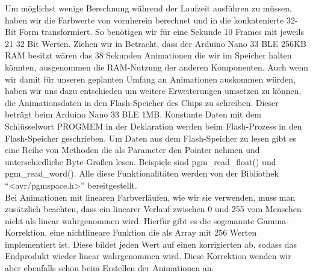         Um möglichst wenige Berechnung während der Laufzeit ausführen zu müssen, haben wir die Farbwerte von vornherein berechnet und in die konkatenierte 32-Bit Form transformiert. 
        So benötigen wir für eine Sekunde 10 Frames mit jeweils 21 32 Bit Werten.
        Ziehen wir in Betracht, dass der Arduino Nano 33 BLE 256KB RAM besitzt wären das 38 Sekunden Animationen die wir im Speicher halten könnten, ausgenommen die RAM-Nutzung der anderen Komponenten.
        Auch wenn wir damit für unseren geplanten Umfang an Animationen auskommen würden, haben wir uns dazu entschieden um weitere Erweiterungen umsetzen zu können, die Animationsdaten in den Flash-Speicher des Chips zu schreiben. Dieser beträgt beim Arduino Nano 33 BLE 1MB.
        Konstante Daten mit dem Schlüsselwort PROGMEM in der Deklaration werden beim Flash-Prozess in den Flash-Speicher geschrieben.
        Um Daten aus dem Flash-Speicher zu lesen gibt es eine Reihe von Methoden die als Parameter den Pointer nehmen und unterschiedliche Byte-Größen lesen. Beispiele sind pgm\_read\_float() und pgm\_read\_word(). Alle diese Funktionalitäten werden von der Bibliothek \enquote{<avr/pgmspace.h>} bereitgestellt.\\
        Bei Animationen mit linearen Farbverläufen, wie wir sie verwenden, muss man zusätzlich beachten, dass ein linearer Verlauf zwischen 0 und 255 vom Menschen nicht als linear wahrgenommen wird. Hierfür gibt es die sogenannte Gamma-Korrektion, eine nichtlineare Funktion die als Array mit 256 Werten implementiert ist. Diese bildet jeden Wert auf einen korrigierten ab, sodass das Endprodukt wieder linear wahrgenommen wird.
        Diese Korrektion wenden wir aber ebenfalls schon beim Erstellen der Animationen an.


    \vspace{1em}
    \vspace{1em}

